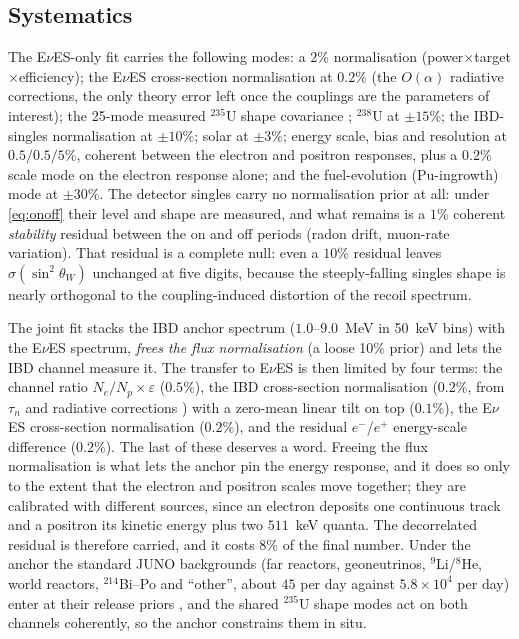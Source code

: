 \documentclass[aps,prd,superscriptaddress,nofootinbib,longbibliography,notitlepage,11pt]{revtex4-2}
\newcommand{\eves}{E$\nu$ES}
\newcommand{\sw}{\sin^2\theta_W}
\begin{document}
\subsection{Systematics}
The \eves{}-only fit carries the following modes: a $2\%$ normalisation
(power$\times$target$\times$efficiency); the \eves{} cross-section normalisation at
$0.2\%$ (the $O(\alpha)$ radiative corrections, the only theory error left once the
couplings are the parameters of interest); the 25-mode measured $^{235}$U shape covariance
\cite{DayaBay:2021dqj}; $^{238}$U at $\pm15\%$; the IBD-singles normalisation at
$\pm10\%$; solar at $\pm3\%$; energy scale, bias and resolution at $0.5/0.5/5\%$,
coherent between the electron and positron responses, plus a $0.2\%$ scale mode on the
electron response alone; and the fuel-evolution (Pu-ingrowth) mode at $\pm30\%$.  The detector singles carry no normalisation prior at all: under
\cref{eq:onoff} their level and shape are measured, and what remains is a $1\%$ coherent
\emph{stability} residual between the on and off periods (radon drift, muon-rate
variation).  That residual is a complete null: even a $10\%$ residual leaves
$\sigma(\sw)$ unchanged at five digits, because the steeply-falling singles shape is
nearly orthogonal to the coupling-induced distortion of the recoil spectrum.

The joint fit stacks the IBD anchor spectrum ($1.0$--$9.0$~MeV in 50~keV bins) with the
\eves{} spectrum, \emph{frees the flux normalisation} (a loose 10\% prior) and lets the IBD
channel measure it.  The transfer to \eves{} is then limited by four terms: the channel
ratio $N_e/N_p\times\varepsilon$ ($0.5\%$), the IBD cross-section normalisation ($0.2\%$,
from $\tau_n$ and radiative corrections \cite{Vogel:1999zy,Strumia:2003zx}) with a
zero-mean linear tilt on top ($0.1\%$), the \eves{} cross-section normalisation ($0.2\%$),
and the residual $e^-$/$e^+$ energy-scale difference ($0.2\%$).  The last of these deserves
a word.  Freeing the flux normalisation is what lets the anchor pin the energy response,
and it does so only to the extent that the electron and positron scales move together;
they are calibrated with different sources, since an electron deposits one continuous
track and a positron its kinetic energy plus two $511$~keV quanta.  The decorrelated
residual is therefore carried, and it costs $8\%$ of the final number.  Under the anchor the standard JUNO
backgrounds (far reactors, geoneutrinos, $^9$Li/$^8$He, world reactors, $^{214}$Bi--Po and
``other'', about $45$ per day against $5.8\times10^4$ per day) enter at their release priors
\cite{JUNO:2025gmd}, and the shared $^{235}$U shape modes act on both channels
coherently, so the anchor constrains them in situ.
\end{document}
